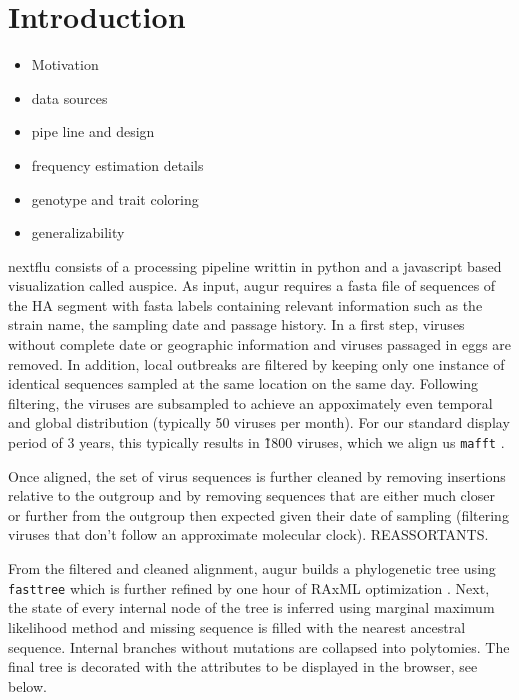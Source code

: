 \documentclass{bioinfo}
\begin{document}
\section*{Introduction}

\begin{itemize}
	\item Motivation
	\item data sources
	\item pipe line and design
	\item frequency estimation details
	\item genotype and trait coloring
	\item generalizability
\end{itemize}

nextflu consists of a processing pipeline writtin in python and a javascript
based visualization called auspice. As input, augur requires a fasta file of
sequences of the HA segment with fasta labels containing relevant information
such as the strain name, the sampling date and passage history. In a first
step, viruses without complete date  or geographic information and viruses
passaged in eggs are removed. In addition, local outbreaks are filtered by
keeping only one instance of identical sequences sampled at the same location
on the same day.  Following filtering, the viruses are subsampled to achieve
an appoximately even temporal and global distribution (typically 50 viruses
per month). For our standard display period of 3 years, this typically results
in \~1800 viruses, which we align us \texttt{mafft} \citep{mafft}.

Once aligned, the set of virus sequences is further cleaned by removing
insertions relative  to the outgroup and by removing sequences that are either
much closer or further from the outgroup then expected given their date of
sampling (filtering viruses that don't follow an approximate molecular clock).
REASSORTANTS.

From the filtered and cleaned alignment, augur builds a phylogenetic tree using
\texttt{fasttree} \citep{Price:2009p47657} which is further refined by one hour
of RAxML optimization \citep{RAxml}. Next, the state of every internal node
of the tree is inferred using marginal maximum likelihood method and missing 
sequence is filled with the nearest ancestral sequence. Internal branches 
without mutations are collapsed into polytomies. The final tree is decorated
with the attributes to be displayed in the browser, see below.  
\end{document}
